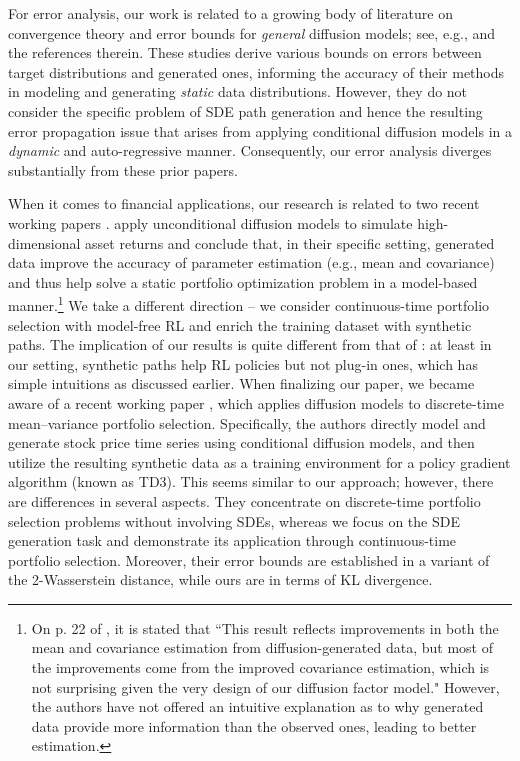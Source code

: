 \documentclass[11pt]{article}
\begin{document}
For error analysis, our work is related to a growing body of literature on convergence theory and error bounds for {\it general} diffusion models;  see, e.g., \cite{bentonnearly, chen2023improved, conforti2025kl, chen2023sampling, fu2024unveil, gao2025wasserstein, li2024towards, li2025d, tang24} and the references therein. These studies derive various bounds on errors between target distributions and generated ones, informing the accuracy of their methods in modeling and generating {\it static} data distributions.
However, they do not consider the specific problem of SDE path generation and hence the resulting error propagation issue that arises from applying conditional diffusion models in a {\it dynamic} and auto-regressive manner. Consequently, our error analysis diverges substantially from these prior papers.







When it comes to financial applications, our research is related to two recent working papers \citep{chen2025diffusion, aghapour2025solving}. \cite{chen2025diffusion} apply unconditional diffusion models to simulate high-dimensional asset returns and conclude that, in their specific setting,  generated data improve the accuracy of parameter estimation (e.g., mean and covariance) and thus help solve a static portfolio optimization problem in a model-based manner.\footnote{On p. 22 of \cite{chen2025diffusion}, it is stated that ``This result reflects improvements in both the mean and covariance estimation from diffusion-generated
data, but most of the improvements come from the improved covariance estimation, which is not
surprising given the very design of our diffusion factor model." However, the authors have not offered an intuitive explanation as to why generated data provide more information than the observed ones, leading to better estimation.} We take a different direction -- we consider continuous-time portfolio selection with model-free RL and enrich the training dataset with synthetic paths. The implication of our results is quite different from that of \cite{chen2025diffusion}: at least in our setting, synthetic paths help RL policies but not plug-in ones, which has simple intuitions as discussed earlier.
When finalizing our paper, we became aware of a recent working paper \cite{aghapour2025solving}, which applies diffusion models to discrete-time mean--variance portfolio selection. Specifically, the authors directly model and generate stock price time series using conditional diffusion models, and then utilize the resulting synthetic data as a training environment for a policy gradient algorithm (known as TD3). This seems similar to our approach; however, there are differences in several aspects. They concentrate on discrete-time portfolio selection problems without involving  SDEs, whereas we focus on the SDE generation task and demonstrate its application through continuous-time portfolio selection. Moreover, their error bounds are established in a variant of the 2-Wasserstein distance, while ours are in terms of KL divergence.
\end{document}
